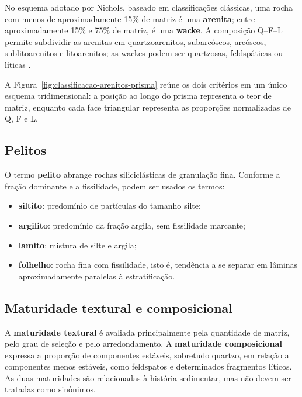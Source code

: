 No esquema adotado por Nichols, baseado em classificações clássicas, uma rocha com
menos de aproximadamente 15\% de matriz é uma \textbf{arenita}; entre aproximadamente
15\% e 75\% de matriz, é uma \textbf{wacke}. A composição Q--F--L permite subdividir as
arenitas em quartzoarenitos, subarcóseos, arcóseos, sublitoarenitos e litoarenitos; as
wackes podem ser quartzosas, feldspáticas ou líticas
\parencite{dott1964,nichols2009}.

A Figura~\ref{fig:classificacao-arenitos-prisma} reúne os dois critérios em um único
esquema tridimensional: a posição ao longo do prisma representa o teor de matriz,
enquanto cada face triangular representa as proporções normalizadas de Q, F e L.



\subsection{Pelitos}

O termo \textbf{pelito} abrange rochas siliciclásticas de granulação fina. Conforme a
fração dominante e a fissilidade, podem ser usados os termos:

\begin{itemize}
  \item \textbf{siltito}: predomínio de partículas do tamanho silte;
  \item \textbf{argilito}: predomínio da fração argila, sem fissilidade marcante;
  \item \textbf{lamito}: mistura de silte e argila;
  \item \textbf{folhelho}: rocha fina com fissilidade, isto é, tendência a se separar em
        lâminas aproximadamente paralelas à estratificação.
\end{itemize}

\subsection{Maturidade textural e composicional}

A \textbf{maturidade textural} é avaliada principalmente pela quantidade de matriz, pelo
grau de seleção e pelo arredondamento. A \textbf{maturidade composicional} expressa a
proporção de componentes estáveis, sobretudo quartzo, em relação a componentes menos
estáveis, como feldspatos e determinados fragmentos líticos. As duas maturidades são
relacionadas à história sedimentar, mas não devem ser tratadas como sinônimos.
